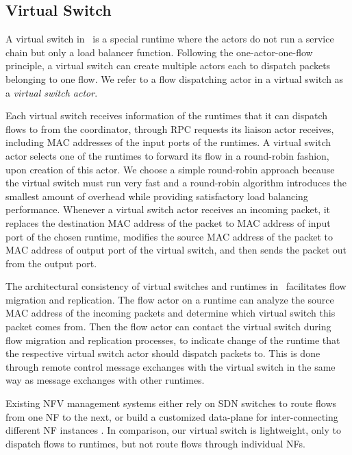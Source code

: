 \subsection{Virtual Switch}
\label{sec:virtualswitch}

A virtual switch in \nfactor~is a special runtime where the actors do not run a service chain but only a load balancer function. Following the one-actor-one-flow principle, a virtual switch can create multiple actors each to dispatch packets belonging to one flow. We refer to a flow dispatching actor in a virtual switch as a {\em virtual switch actor}.


Each virtual switch receives information of the runtimes that it can dispatch flows to from the coordinator, through RPC requests its liaison actor receives, including MAC addresses of the input ports of the runtimes. A virtual switch actor selects one of the runtimes to forward its flow in a round-robin fashion, upon creation of this actor. We choose a simple round-robin approach because the virtual switch must run very fast and a round-robin algorithm introduces the smallest amount of overhead while providing satisfactory load balancing performance. Whenever a virtual switch actor receives an incoming packet, it replaces the destination MAC address of the packet to MAC address of input port of the chosen runtime, modifies the source MAC address of the packet to MAC address of output port of the virtual switch, and then sends the packet out from the output port.

The architectural consistency of virtual switches and runtimes in \nfactor~facilitates flow migration and replication. The flow actor on a runtime can analyze the source MAC address of the incoming packets and determine which virtual switch this packet comes from. Then the flow actor can contact the virtual switch during flow migration and replication processes, to indicate change of the runtime that the respective virtual switch actor should dispatch packets to. This is done through remote control message exchanges with the virtual switch in the same way as message exchanges with other runtimes.


Existing NFV management systems either rely on SDN switches \cite{gember2012stratos, gember2015opennf} to route flows from one NF to the next, or build a customized data-plane for inter-connecting different NF instances \cite{palkar2015e2}. In comparison, our virtual switch is lightweight, only to dispatch flows to runtimes, but not route flows through individual NFs.


